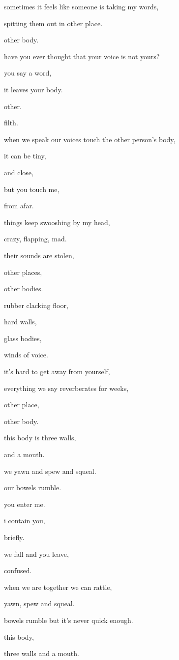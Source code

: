 \documentclass{article}
\begin{document}
	sometimes it feels like someone is taking my words,

	spitting them out in other place.

	other body.\newpage

	have you ever thought that your voice is not yours?

	you say a word,

	it leaves your body.

	other.

	filth.\newpage

	when we speak our voices touch the other person's body,

	it can be tiny,

	and close,

	but you touch me,

	from afar.\newpage

	things keep swooshing by my head,

	crazy, flapping, mad.

	their sounds are stolen,

	other places,

	other bodies.\newpage

	rubber clacking floor,

	hard walls,

	glass bodies,

	winds of voice.\newpage

	it's hard to get away from yourself,

	everything we say reverberates for weeks,

	other place,

	other body.

	\newpage
	this body is three walls,

	and a mouth.

	we yawn and spew and squeal.

	our bowels rumble.\newpage

	you enter me.

	i contain you, 

	briefly.

	we fall and you leave,

	confused.\newpage

	when we are together we can rattle,

	yawn, spew and squeal.

	bowels rumble but it's never quick enough.\newpage

	this body,

	three walls and a mouth.
\end{document}
